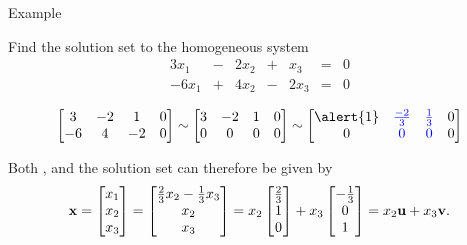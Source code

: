 \documentclass[xcolor=dvipsnames,aspectratio=169,t]{beamer}
\begin{document}
\begin{frame}{Example}
\medskip

  Find the solution set to the homogeneous system
  \[   \begin{array}{ccccccc}
     3x_1 & - & 2x_2 & + & x_3&=&0\\
     -6x_1& + & 4x_2 & - & 2x_3 &=& 0
  \end{array}  \]

  \[ \bbm 3 & -2 & 1 & 0\\
  -6 & 4 & -2 & 0 \ebm \sim
  \bbm 3 & -2 & 1 & 0\\
  0 & 0 & 0 & 0 \ebm \sim
  \bbm \alert{1} & \colorb{\frac{-2}{3}} & \colorb{\frac{1}{3}} & 0\\
  0 & \colorb{0} & \colorb{0} & 0  \ebm \]
  \medskip

  Both , and the solution set can therefore be given by
  \[ \mathbf{x} = \begin{bmatrix} x_1 \\ x_2 \\ x_3 \end{bmatrix} = \begin{bmatrix} \frac{2}{3}x_2-\frac{1}{3} x_3 \\ x_2 \\ x_3 \end{bmatrix} =  x_2 \begin{bmatrix} \frac{2}{3} \\ 1 \\ 0 \end{bmatrix} +  x_3 \begin{bmatrix} -\frac{1}{3} \\ 0 \\ 1 \end{bmatrix} = x_2 \mathbf{u}  + x_3 \mathbf{v}. \]
\end{frame}


% 
% 
% 
% 
\end{document}
